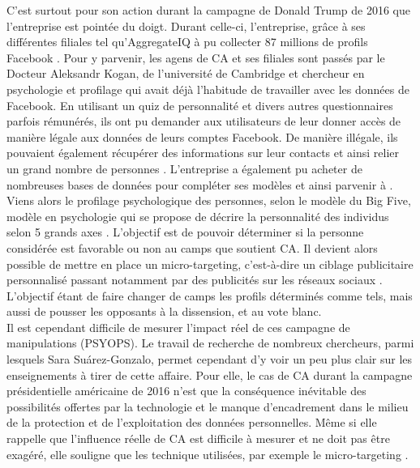 \documentclass{article}
\begin{document}
C’est surtout pour son action durant la campagne de Donald Trump de 2016 que l’entreprise est pointée du doigt. Durant celle-ci, l’entreprise, grâce à ses différentes filiales tel qu’AggregateIQ à pu collecter 87 millions de profils Facebook \cite{noauthor_undated-yf}. Pour y parvenir, les agens de CA et ses filiales sont passés par le Docteur Aleksandr Kogan, de l’université de Cambridge et chercheur en psychologie et profilage qui avait déjà l’habitude de travailler avec les données de Facebook. En utilisant un quiz de personnalité et divers autres questionnaires parfois rémunérés, ils ont pu demander aux utilisateurs de leur donner accès de manière légale aux données de leurs comptes Facebook. De manière illégale, ils pouvaient également récupérer des informations sur leur contacts et ainsi relier un grand nombre de personnes \cite{Cadwalladr2017-aq}. L’entreprise a également pu acheter de nombreuses bases de données pour compléter ses modèles et ainsi parvenir à  \cite{Hern2018-ae}.\\

Viens alors le profilage psychologique des personnes, selon le modèle du Big Five, modèle en psychologie qui se propose de décrire la personnalité des individus selon 5 grands axes \cite{Rothmann2003-gd}. L’objectif est de pouvoir déterminer si la personne considérée est favorable ou non au camps que soutient CA. Il devient alors possible de mettre en place un micro-targeting, c’est-à-dire un ciblage publicitaire personnalisé passant notamment par des publicités sur les réseaux sociaux \cite{Sanjaume2010-ys}. L'objectif étant de faire changer de camps les profils déterminés comme tels, mais aussi de pousser les opposants à la dissension, et au vote blanc.\\

Il est cependant difficile de mesurer l’impact réel de ces campagne de manipulations (PSYOPS). Le travail de recherche de nombreux chercheurs, parmi lesquels Sara Suárez-Gonzalo, permet cependant d’y voir un peu plus clair sur les enseignements à tirer de cette affaire. Pour elle, le cas de CA durant la campagne présidentielle américaine de 2016 n’est que la conséquence inévitable des possibilités offertes par la technologie et le manque d’encadrement dans le milieu de la protection et de l’exploitation des données personnelles. Même si elle rappelle que l’influence réelle de CA est difficile à mesurer et ne doit pas être exagéré, elle souligne que les technique utilisées, par exemple le micro-targeting  \cite{Suarez-Gonzalo2018-ct}.\\
\end{document}
